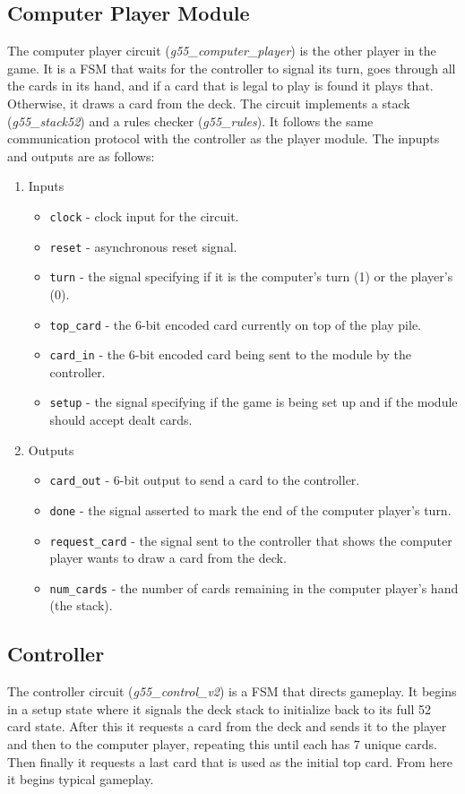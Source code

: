\documentclass[12pt]{article}
\begin{document}
\subsection{Computer Player Module}
The computer player circuit (\textit{g55\_computer\_player}) is the other player in the game. It is a FSM that waits for the controller to signal its turn, goes through all the cards in its hand, and if a card that is legal to play is found it plays that. Otherwise, it draws a card from the deck.  The circuit implements a stack (\textit{g55\_stack52}) and a rules checker (\textit{g55\_rules}). It follows the same communication protocol with the controller as the player module. The inpupts and outputs are as follows:\\

\begin{enumerate}
\item Inputs
\begin{itemize}
\item \texttt{clock} - clock input for the circuit.
\item \texttt{reset} - asynchronous reset signal.
\item \texttt{turn} - the signal specifying if it is the computer's turn (1) or the player's (0).
\item \texttt{top\_card} - the 6-bit encoded card currently on top of the play pile.
\item \texttt{card\_in} - the 6-bit encoded card being sent to the module by the controller.
\item \texttt{setup} - the signal specifying if the game is being set up and if the module should accept dealt cards.
\end{itemize}
\item Outputs
\begin{itemize}
\item \texttt{card\_out} - 6-bit output to send a card to the controller.
\item \texttt{done} - the signal asserted to mark the end of the computer player's turn.
\item \texttt{request\_card} - the signal sent to the controller that shows the computer player wants to draw a card from the deck.
\item \texttt{num\_cards} - the number of cards remaining in the computer player's hand (the stack).
\end{itemize}
\end{enumerate}

\subsection{Controller}
The controller circuit (\textit{g55\_control\_v2}) is a FSM that directs gameplay. It begins in a setup state where it signals the deck stack to initialize back to its full 52 card state. After this it requests a card from the deck and sends it to the player and then to the computer player, repeating this until each has 7 unique cards. Then finally it requests a last card that is used as the initial top card. From here it begins typical gameplay.\\
\end{document}
